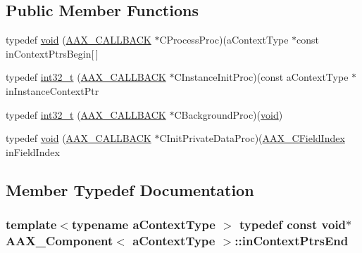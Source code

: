 \subsection*{Public Member Functions}
\begin{DoxyCompactItemize}
\item 
typedef \hyperlink{a00029_a152cdf3bab64bdd62f9113c55d54e51f}{void} (\hyperlink{a00149_aaa22112139aa627574b1ef562f579d43}{A\+A\+X\+\_\+\+C\+A\+L\+L\+B\+A\+C\+K} $\ast$C\+Process\+Proc)(a\+Context\+Type $\ast$const in\+Context\+Ptrs\+Begin\mbox{[}$\,$\mbox{]}
\item 
typedef \hyperlink{a00029_adfde6fdf25777c51a03f10818fcca471}{int32\+\_\+t} (\hyperlink{a00149_aaa22112139aa627574b1ef562f579d43}{A\+A\+X\+\_\+\+C\+A\+L\+L\+B\+A\+C\+K} $\ast$C\+Instance\+Init\+Proc)(const a\+Context\+Type $\ast$in\+Instance\+Context\+Ptr
\item 
typedef \hyperlink{a00029_a5bc079fbdd45856b78b92905c3688a91}{int32\+\_\+t} (\hyperlink{a00149_aaa22112139aa627574b1ef562f579d43}{A\+A\+X\+\_\+\+C\+A\+L\+L\+B\+A\+C\+K} $\ast$C\+Background\+Proc)(\hyperlink{a00029_a152cdf3bab64bdd62f9113c55d54e51f}{void})
\item 
typedef \hyperlink{a00029_a5cbd5c26f713120aee2b8223cdf4faf7}{void} (\hyperlink{a00149_aaa22112139aa627574b1ef562f579d43}{A\+A\+X\+\_\+\+C\+A\+L\+L\+B\+A\+C\+K} $\ast$C\+Init\+Private\+Data\+Proc)(\hyperlink{a00149_ae807f8986143820cfb5d6da32165c9c7}{A\+A\+X\+\_\+\+C\+Field\+Index} in\+Field\+Index
\end{DoxyCompactItemize}


\subsection{Member Typedef Documentation}
\hypertarget{a00029_ab8ecfd951dc7597c9021e7e335e8838b}{}
\subsubsection[{in\+Context\+Ptrs\+End}]{\setlength{\rightskip}{0pt plus 5cm}template$<$typename a\+Context\+Type $>$ typedef const {\bf void}$\ast$ {\bf A\+A\+X\+\_\+\+Component}$<$ a\+Context\+Type $>$\+::{\bf in\+Context\+Ptrs\+End}}\label{a00029_ab8ecfd951dc7597c9021e7e335e8838b}
\hypertarget{a00029_abdfa84e561bac489ea7e24bd6bd4eeb1}{}
